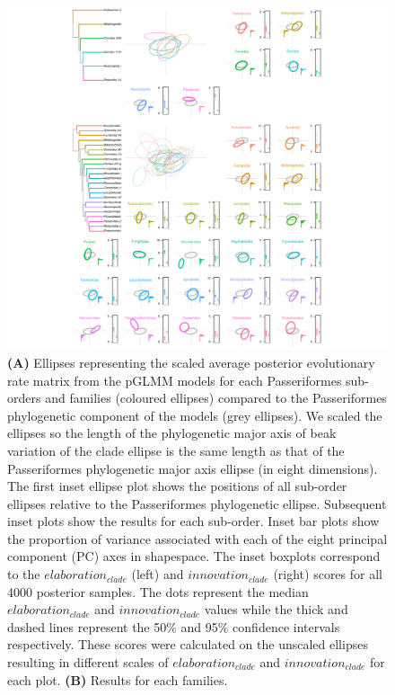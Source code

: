 \documentclass[12pt,a4paper]{article}
\begin{document}
\begin{figure}[H]
\centering
   \includegraphics[width=1\textwidth]{Figures/ellipses_passeriformes.pdf}
\caption{\textbf{(A)} Ellipses representing the scaled average posterior evolutionary rate matrix from the pGLMM models for each Passeriformes sub-orders and families (coloured ellipses) compared to the Passeriformes phylogenetic component of the models (grey ellipses).
We scaled the ellipses so the length of the phylogenetic major axis of beak variation of the clade ellipse is the same length as that of the Passeriformes phylogenetic major axis ellipse (in eight dimensions).
The first inset ellipse plot shows the positions of all sub-order ellipses relative to the Passeriformes phylogenetic ellipse.
Subsequent inset plots show the results for each sub-order. 
Inset bar plots show the proportion of variance associated with each of the eight principal component (PC) axes in shapespace.
The inset boxplots correspond to the $elaboration_{clade}$ (left) and $innovation_{clade}$ (right) scores for all 4000 posterior samples.
The dots represent the median $elaboration_{clade}$ and $innovation_{clade}$ values while the thick and dashed lines represent the 50\% and 95\% confidence intervals respectively.
These scores were calculated on the unscaled ellipses resulting in different scales of $elaboration_{clade}$ and $innovation_{clade}$ for each plot.
\textbf{(B)} Results for each families.}
\label{fig_ellipses_passeriformes}
\end{figure}
\end{document}
